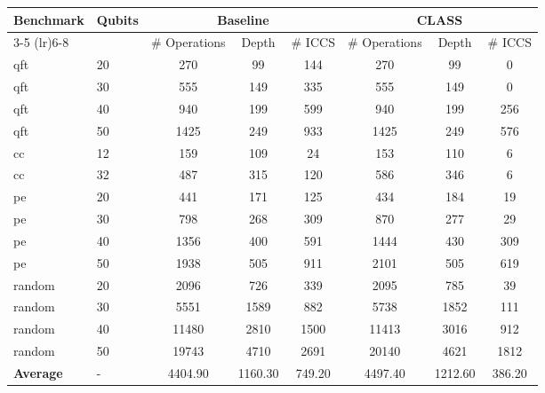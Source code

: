 \documentclass{article}
\newcommand{\name}{CLASS}
\begin{document}
\begin{table*}[ht]
    \centering
    \caption{Comparison between \name{} and baseline.}
    \begin{tabular}{llcccccc}
        \toprule
        \textbf{Benchmark} & \textbf{Qubits} & \multicolumn{3}{c}{Baseline} & \multicolumn{3}{c}{\name{}} \\
        \cmidrule(lr){3-5} \cmidrule(lr){6-8}
        & & \# Operations & Depth & \# ICCS & \# Operations & Depth & \# ICCS \\
        \midrule
        qft & 20 & 270 & 99 & 144 & 270 & 99 & 0 \\
        qft & 30 & 555 & 149 & 335 & 555 & 149 & 0 \\
        qft & 40 & 940 & 199 & 599 & 940 & 199 & 256 \\
        qft & 50 & 1425 & 249 & 933 & 1425 & 249 & 576 \\ \midrule
        cc & 12 & 159 & 109 & 24 & 153 & 110 & 6 \\
        cc & 32 & 487 & 315 & 120 & 586 & 346 & 6 \\
        pe & 20 & 441 & 171 & 125 & 434 & 184 & 19 \\
        pe & 30 & 798 & 268 & 309 & 870 & 277 & 29 \\
        pe & 40 & 1356 & 400 & 591 & 1444 & 430 & 309 \\
        pe & 50 & 1938 & 505 & 911 & 2101 & 505 & 619 \\
        random & 20 & 2096 & 726 & 339 & 2095 & 785 & 39 \\
        random & 30 & 5551 & 1589 & 882 & 5738 & 1852 & 111 \\
        random & 40 & 11480 & 2810 & 1500 & 11413 & 3016 & 912 \\
        random & 50 & 19743 & 4710 & 2691 & 20140 & 4621 & 1812 \\
        \midrule
        \textbf{Average} & - & 4404.90 & 1160.30 & 749.20 & 4497.40 & 1212.60 & 386.20 \\
        \bottomrule
    \end{tabular}
    \label{tab:main_res}
\end{table*}
\end{document}
